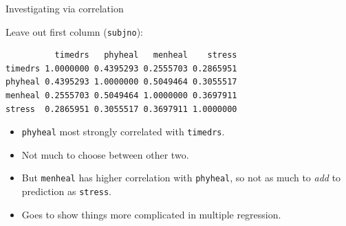 \begin{frame}[fragile]{Investigating via correlation}
  
Leave out first column (\texttt{subjno}):
  
 
\begin{knitrout}
\color{fgcolor}\begin{kframe}
\begin{alltt}
\hlstd{(visits[,}\hlopt{-}\hlstd{])}
\end{alltt}
\begin{verbatim}
          timedrs   phyheal   menheal    stress
timedrs 1.0000000 0.4395293 0.2555703 0.2865951
phyheal 0.4395293 1.0000000 0.5049464 0.3055517
menheal 0.2555703 0.5049464 1.0000000 0.3697911
stress  0.2865951 0.3055517 0.3697911 1.0000000
\end{verbatim}
\end{kframe}
\end{knitrout}
  
\begin{itemize}
\item \texttt{phyheal} most strongly correlated with \texttt{timedrs}.
\item Not much to choose between other two.
\item But \texttt{menheal} has higher correlation with \texttt{phyheal},
  so not as much to \emph{add} to prediction as \texttt{stress}.
\item Goes to show things more complicated in multiple regression.

\end{itemize}

  
\end{frame}

